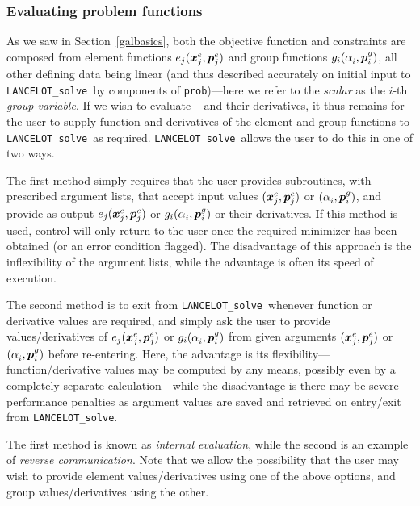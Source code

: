 \documentclass{galahad}
\newcommand{\fullpackagename}{LANC\-E\-LOT}
\newcommand{\solver}{{\tt \fullpackagename\_solve}}
\begin{document}

\subsubsection{Evaluating problem functions\label{pfe}}

As we saw in Section~\ref{galbasics},
both the objective function  and constraints 
are composed from element functions $e_j({\bm{x}}^e_j, {\bm{p}}^e_j)$ and
group functions $g_i( \alpha^{ }_i, {\bm{p}}^g_i )$, all other defining data
being linear (and thus described accurately on initial input
to \solver\ by components of {\tt prob})---here we refer to the {\em scalar}
as the $i$-th {\em group variable}. If we wish to evaluate
-- and their derivatives,
it thus remains for the user to supply function and derivatives
of the element and group functions to \solver\ as required.
\solver\ allows the user to do this in one of two ways.

The first method simply requires that the user provides
subroutines, with prescribed argument lists, that accept input
values $({\bm{x}}^e_j, {\bm{p}}^e_j)$ or $(\alpha^{ }_i, {\bm{p}}^g_i)$, and provide
as output
$e_j({\bm{x}}^e_j, {\bm{p}}^e_j)$ or $g_i(\alpha^{ }_i, {\bm{p}}^g_i)$
or their derivatives. If this method is used, control will only return
to the user once the required minimizer has been obtained (or an error
condition flagged). The disadvantage of this approach is the inflexibility
of the argument lists, while the advantage is often its speed of execution.

The second method is to exit from \solver\ whenever function or derivative
values are required, and simply ask the user to provide
values/derivatives of
$e_j({\bm{x}}^e_j, {\bm{p}}^e_j)$ or $g_i(\alpha^{ }_i, {\bm{p}}^g_i)$
from given arguments
$({\bm{x}}^e_j, {\bm{p}}^e_j)$ or $(\alpha^{ }_i, {\bm{p}}^g_i)$ before re-entering.
Here, the advantage is
its flexibility---function/derivative values may be computed by any means,
possibly even by a completely separate calculation---while the
disadvantage is there may be severe performance penalties as
argument values are saved and retrieved on entry/exit from \solver.

The first method is known as {\em internal evaluation}, while the
second is an example of {\em reverse communication}.
Note that we allow the possibility that the user may wish to provide
element values/derivatives using one of the above options,
and group values/derivatives using the other.
\end{document}
